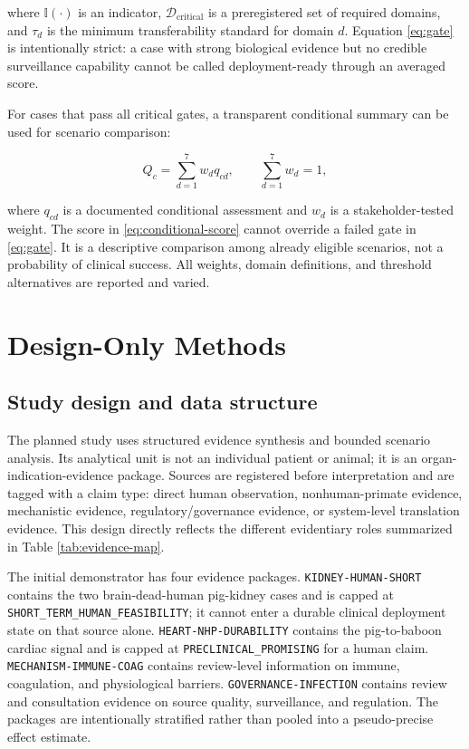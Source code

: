 \documentclass[conference]{IEEEtran}
\newcommand{\state}[1]{\texttt{#1}}
\begin{document}
where $\mathbb{I}(\cdot)$ is an indicator, $\mathcal{D}_{\mathrm{critical}}$ is a preregistered set of required domains, and $\tau_d$ is the minimum transferability standard for domain $d$. Equation \eqref{eq:gate} is intentionally strict: a case with strong biological evidence but no credible surveillance capability cannot be called deployment-ready through an averaged score.

For cases that pass all critical gates, a transparent conditional summary can be used for scenario comparison:

\begin{equation}
Q_c=\sum_{d=1}^{7}w_dq_{cd}, \qquad \sum_{d=1}^{7}w_d=1,
\label{eq:conditional-score}
\end{equation}

where $q_{cd}$ is a documented conditional assessment and $w_d$ is a stakeholder-tested weight. The score in \eqref{eq:conditional-score} cannot override a failed gate in \eqref{eq:gate}. It is a descriptive comparison among already eligible scenarios, not a probability of clinical success. All weights, domain definitions, and threshold alternatives are reported and varied.

\section{Design-Only Methods}

\subsection{Study design and data structure}

The planned study uses structured evidence synthesis and bounded scenario analysis. Its analytical unit is not an individual patient or animal; it is an organ-indication-evidence package. Sources are registered before interpretation and are tagged with a claim type: direct human observation, nonhuman-primate evidence, mechanistic evidence, regulatory/governance evidence, or system-level translation evidence. This design directly reflects the different evidentiary roles summarized in Table \ref{tab:evidence-map}.

The initial demonstrator has four evidence packages. \state{KIDNEY-HUMAN-SHORT} contains the two brain-dead-human pig-kidney cases and is capped at \state{SHORT\_TERM\_HUMAN\_FEASIBILITY}; it cannot enter a durable clinical deployment state on that source alone. \state{HEART-NHP-DURABILITY} contains the pig-to-baboon cardiac signal and is capped at \state{PRECLINICAL\_PROMISING} for a human claim. \state{MECHANISM-IMMUNE-COAG} contains review-level information on immune, coagulation, and physiological barriers. \state{GOVERNANCE-INFECTION} contains review and consultation evidence on source quality, surveillance, and regulation. The packages are intentionally stratified rather than pooled into a pseudo-precise effect estimate.
\end{document}
